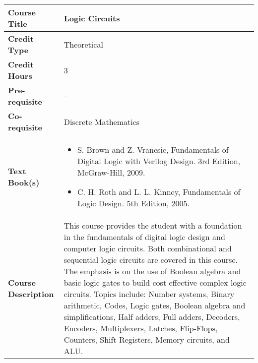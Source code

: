 \documentclass[11pt]{article}
\begin{document}
\begin{table}[h!]
\begin{tabular}{|l|l|}
\hline
\textbf{Course Title}       &  Logic Circuits \\ \hline
\textbf{Credit Type}        &   Theoretical \\ \hline
\textbf{Credit Hours}       &  3 \\ \hline
\textbf{Pre-requisite}       & --  \\ \hline
\textbf{Co-requisite}       &   Discrete Mathematics \\ \hline
\textbf{Text Book(s)}       & \begin{minipage}{.70\textwidth}
\begin{itemize} \itemsep-0.4em
	\vspace{3mm}
	\item S. Brown and Z. Vranesic, Fundamentals of Digital Logic with Verilog Design. 3rd Edition, McGraw-Hill, 2009.
	\item C. H. Roth and L. L. Kinney, Fundamentals of Logic Design. 5th Edition, 2005.
	\vspace{3mm}
\end{itemize}
\end{minipage}\\ \hline
\textbf{Course Description} & \begin{minipage}{.70\textwidth}
\vspace{3mm}
This course provides the student with a foundation in the fundamentals of digital logic design and
computer logic circuits. Both combinational and sequential logic circuits are covered in this course. The
emphasis is on the use of Boolean algebra and basic logic gates to build cost effective complex logic
circuits. Topics include: Number systems, Binary arithmetic, Codes, Logic gates, Boolean algebra and
simplifications, Half adders, Full adders, Decoders, Encoders, Multiplexers, Latches, Flip-Flops,
Counters, Shift Registers, Memory circuits, and ALU.
\vspace{3mm}
\end{minipage} \\ \hline
\end{tabular}
\end{table}
\end{document}
